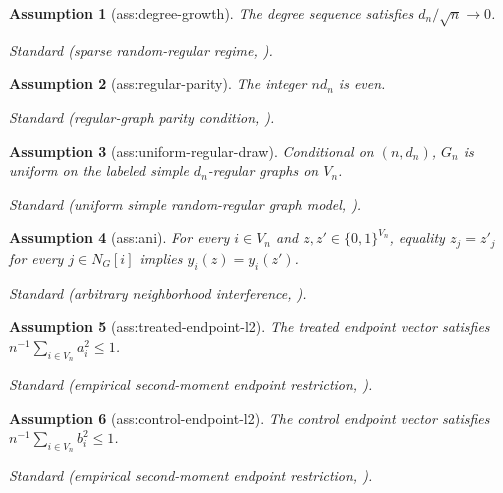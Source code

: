 \documentclass{article}
\newtheorem{assumption}{Assumption}
\begin{document}
\begin{assumption}[ass:degree-growth]\label{ass:degree-growth}
The degree sequence satisfies \(d_n/\sqrt n\to0\).
\par\smallskip\noindent\emph{Standard} (sparse random-regular regime, \cite{KandirosHarshawSavje2026Minimax}).
\end{assumption}

\begin{assumption}[ass:regular-parity]\label{ass:regular-parity}
The integer \(nd_n\) is even.
\par\smallskip\noindent\emph{Standard} (regular-graph parity condition, \cite{BehagueIlkovicMontgomery2025Sandwich}).
\end{assumption}

\begin{assumption}[ass:uniform-regular-draw]\label{ass:uniform-regular-draw}
Conditional on \((n,d_n)\), \(G_n\) is uniform on the labeled simple \(d_n\)-regular graphs on \(V_n\).
\par\smallskip\noindent\emph{Standard} (uniform simple random-regular graph model, \cite{KandirosHarshawSavje2026Minimax}).
\end{assumption}

\begin{assumption}[ass:ani]\label{ass:ani}
For every \(i\in V_n\) and \(z,z'\in\{0,1\}^{V_n}\), equality \(z_j=z'_j\) for every \(j\in N_G[i]\) implies \(y_i(z)=y_i(z')\).
\par\smallskip\noindent\emph{Standard} (arbitrary neighborhood interference, \cite{KandirosHarshawSavje2026Minimax}).
\end{assumption}

\begin{assumption}[ass:treated-endpoint-l2]\label{ass:treated-endpoint-l2}
The treated endpoint vector satisfies \(n^{-1}\sum_{i\in V_n}a_i^2\le1\).
\par\smallskip\noindent\emph{Standard} (empirical second-moment endpoint restriction, \cite{KandirosHarshawSavje2026Minimax}).
\end{assumption}

\begin{assumption}[ass:control-endpoint-l2]\label{ass:control-endpoint-l2}
The control endpoint vector satisfies \(n^{-1}\sum_{i\in V_n}b_i^2\le1\).
\par\smallskip\noindent\emph{Standard} (empirical second-moment endpoint restriction, \cite{KandirosHarshawSavje2026Minimax}).
\end{assumption}
\end{document}
